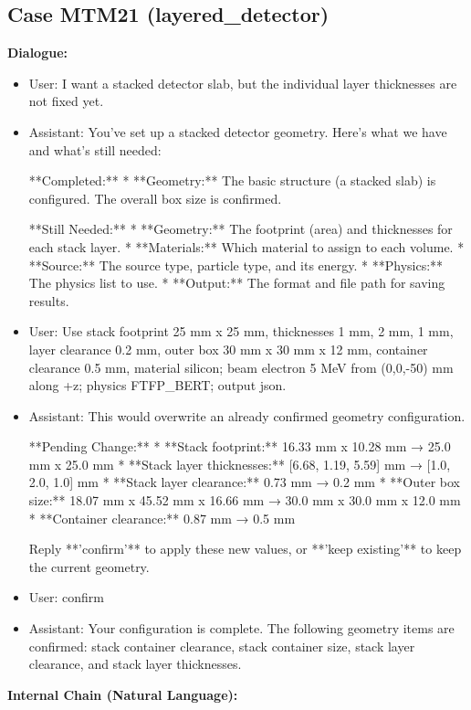 \documentclass[11pt]{ctexart}
\begin{document}
\subsection{Case MTM21 (layered\_detector)}
\textbf{Dialogue:}
\begin{itemize}
\item User: I want a stacked detector slab, but the individual layer thicknesses are not fixed yet.
\item Assistant: You've set up a stacked detector geometry. Here's what we have and what's still needed:

**Completed:**
*   **Geometry:** The basic structure (a stacked slab) is configured. The overall box size is confirmed.

**Still Needed:**
*   **Geometry:** The footprint (area) and thicknesses for each stack layer.
*   **Materials:** Which material to assign to each volume.
*   **Source:** The source type, particle type, and its energy.
*   **Physics:** The physics list to use.
*   **Output:** The format and file path for saving results.
\item User: Use stack footprint 25 mm x 25 mm, thicknesses 1 mm, 2 mm, 1 mm, layer clearance 0.2 mm, outer box 30 mm x 30 mm x 12 mm, container clearance 0.5 mm, material silicon; beam electron 5 MeV from (0,0,-50) mm along +z; physics FTFP\_BERT; output json.
\item Assistant: This would overwrite an already confirmed geometry configuration.

**Pending Change:**
*   **Stack footprint:** 16.33 mm x 10.28 mm → 25.0 mm x 25.0 mm
*   **Stack layer thicknesses:** [6.68, 1.19, 5.59] mm → [1.0, 2.0, 1.0] mm
*   **Stack layer clearance:** 0.73 mm → 0.2 mm
*   **Outer box size:** 18.07 mm x 45.52 mm x 16.66 mm → 30.0 mm x 30.0 mm x 12.0 mm
*   **Container clearance:** 0.87 mm → 0.5 mm

Reply **'confirm'** to apply these new values, or **'keep existing'** to keep the current geometry.
\item User: confirm
\item Assistant: Your configuration is complete. The following geometry items are confirmed: stack container clearance, stack container size, stack layer clearance, and stack layer thicknesses.
\end{itemize}
\textbf{Internal Chain (Natural Language):}
\end{document}
